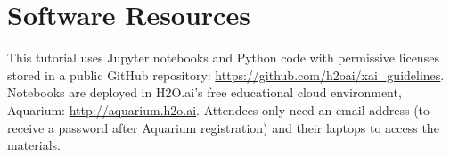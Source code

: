 \documentclass[sigconf]{acmart}
\begin{document}
\section*{Software Resources}

This tutorial uses Jupyter notebooks and Python code with permissive licenses stored in a public GitHub repository: \url{https://github.com/h2oai/xai_guidelines}. Notebooks are deployed in H2O.ai's free educational cloud environment, Aquarium: \url{http://aquarium.h2o.ai}. Attendees only need an email address (to receive a password after Aquarium registration) and their laptops to access the materials.
\vspace{50pt}
\newline
\vspace{60pt}
\newline
\vspace{60pt}
\newline



\end{document}
